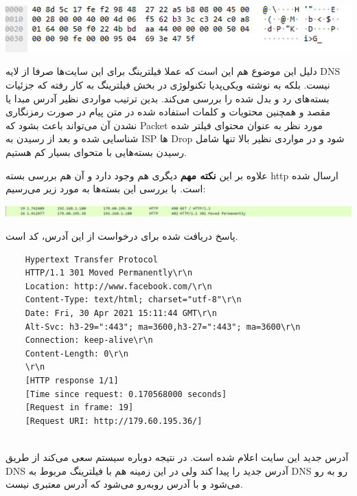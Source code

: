 \documentclass[12pt]{article}
\begin{document}
\begin{enumerate}
\begin{center}
	\includegraphics[width = 0.5 \textwidth]{images/9.png}
\end{center}

دلیل این موضوع هم این است که عملا فیلترینگ برای این سایت‌ها صرفا از لایه DNS نیست. بلکه به نوشته ویکی‌پدیا تکنولوژی  در بخش فیلترینگ به کار رفته که جزئیات بسته‌های رد و بدل شده را بررسی می‌کند. بدین ترتیب مواردی نظیر آدرس مبدا یا مقصد و همچنین محتویات و کلمات استفاده شده در متن پیام در صورت رمزنگاری نشدن آن می‌تواند باعث بشود که Packet مورد نظر به عنوان محتوای فیلتر شده شناسایی شده و بعد از رسیدن به ISP ها Drop شود و در مواردی نظیر بالا تنها شامل رسیدن بسته‌هایی با متحوای بسیار کم هستیم.

علاوه بر این \textbf{نکته مهم} دیگری هم وجود دارد و آن هم بررسی بسته http ارسال شده است. با بررسی این بسته‌ها به مورد زیر می‌رسیم:

\begin{center}
	\includegraphics[width = 0.5 \textwidth]{images/10.png}
\end{center}

پاسخ دریافت شده برای درخواست  از این آدرس، کد  است.


\begin{latin}
	\begin{verbatim}
	Hypertext Transfer Protocol
	HTTP/1.1 301 Moved Permanently\r\n
	Location: http://www.facebook.com/\r\n
	Content-Type: text/html; charset="utf-8"\r\n
	Date: Fri, 30 Apr 2021 15:11:44 GMT\r\n
	Alt-Svc: h3-29=":443"; ma=3600,h3-27=":443"; ma=3600\r\n
	Connection: keep-alive\r\n
	Content-Length: 0\r\n
	\r\n
	[HTTP response 1/1]
	[Time since request: 0.170568000 seconds]
	[Request in frame: 19]
	[Request URI: http://179.60.195.36/]
		
	\end{verbatim}
\end{latin}

آدرس جدید این سایت  اعلام شده است. در نتیجه دوباره سیستم سعی‌ می‌کند از طریق DNS آدرس جدید را پیدا کند ولی در این زمینه هم با فیلترینگ مربوط به DNS رو به رو می‌شود و با آدرس  رو‌به‌رو می‌شود که آدرس معتبری نیست.

	
\end{enumerate}
\end{document}
